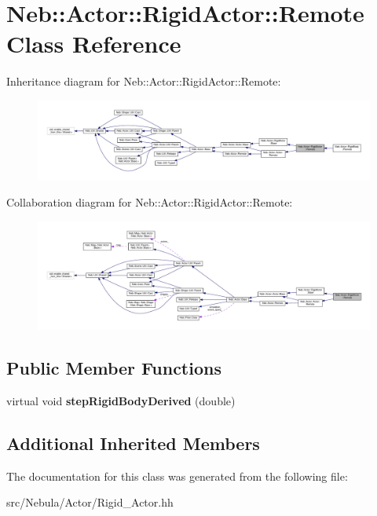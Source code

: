 \hypertarget{classNeb_1_1Actor_1_1RigidActor_1_1Remote}{\section{Neb\-:\-:Actor\-:\-:Rigid\-Actor\-:\-:Remote Class Reference}
\label{classNeb_1_1Actor_1_1RigidActor_1_1Remote}
}


Inheritance diagram for Neb\-:\-:Actor\-:\-:Rigid\-Actor\-:\-:Remote\-:
\nopagebreak
\begin{figure}[H]
\begin{center}
\leavevmode
\includegraphics[width=350pt]{classNeb_1_1Actor_1_1RigidActor_1_1Remote__inherit__graph}
\end{center}
\end{figure}


Collaboration diagram for Neb\-:\-:Actor\-:\-:Rigid\-Actor\-:\-:Remote\-:
\nopagebreak
\begin{figure}[H]
\begin{center}
\leavevmode
\includegraphics[width=350pt]{classNeb_1_1Actor_1_1RigidActor_1_1Remote__coll__graph}
\end{center}
\end{figure}
\subsection*{Public Member Functions}
\begin{DoxyCompactItemize}
\item 
\hypertarget{classNeb_1_1Actor_1_1RigidActor_1_1Remote_a25129df2d6bfa59913313197709fb31b}{virtual void {\bfseries step\-Rigid\-Body\-Derived} (double)}\label{classNeb_1_1Actor_1_1RigidActor_1_1Remote_a25129df2d6bfa59913313197709fb31b}

\end{DoxyCompactItemize}
\subsection*{Additional Inherited Members}


The documentation for this class was generated from the following file\-:\begin{DoxyCompactItemize}
\item 
src/\-Nebula/\-Actor/Rigid\-\_\-\-Actor.\-hh\end{DoxyCompactItemize}

